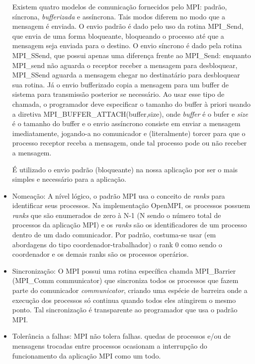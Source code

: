 \documentclass[a4paper,10pt]{article}
\begin{document}
\begin{itemize}
Existem quatro modelos de comunicação fornecidos pelo MPI: padrão, síncrona, \emph{bufferizada} e assíncrona. Tais modos diferem no modo que a mensagem é enviada. O envio padrão é dado pelo uso da rotina MPI\_Send, que envia de uma forma bloqueante, bloqueando o processo até que a mensagem seja enviada para o destino. O envio síncrono é dado pela rotina MPI\_SSend, que possui apenas uma diferença frente ao MPI\_Send: enquanto MPI\_send não aguarda o receptor receber a mensagem para desbloquear, MPI\_SSend aguarda a mensagem chegar no destinatário para desbloquear sua rotina. Já o envio bufferizado copia a mensagem para um buffer de sistema para transmissão posterior se necessário. Ao usar esse tipo de chamada, o programador deve especificar o tamanho do buffer à priori usando a diretiva MPI\_BUFFER\_ATTACH(buffer,size), onde \emph{buffer} é o bufer e \emph{size} é o tamanho do buffer e o envio assíncrono consiste em enviar a mensagem imediatamente, jogando-a no comunicador e (literalmente) torcer para que o processo receptor receba a mensagem, onde tal processo pode ou não receber a mensagem.

É utilizado o envio padrão (bloqueante) na nossa aplicação por ser o mais simples e necessário para a aplicação.\\


\item{Nomeação}: A nível lógico, o padrão MPI usa o conceito de \emph{ranks} para identificar seus processos. Na implementação OpenMPI, os processos possuem \emph{ranks} que são enumerados de zero à N-1 (N sendo o número total de processos da aplicação MPI)  e os \emph{ranks} são os identificadores de um processo dentro de um dado comunicador. Por padrão, costuma-se usar (em abordagens do tipo coordenador-trabalhador) o rank 0 como sendo o coordenador e os demais ranks são os processos operários.\\

\item{Sincronização}: O MPI possui uma rotina específica chamda MPI\_Barrier (MPI\_Comm communicator) que sincroniza todos os processos que fazem parte do comunicador \emph{communicator}, criando uma espécie de barreira onde a execução dos processos só continua quando todos eles atingirem o mesmo ponto. Tal sincronização é transparente ao programador que usa o padrão MPI.

\item{Tolerância a falhas}: MPI não tolera falhas. quedas de processos e/ou de mensagens trocadas entre processos ocasionam a interrupção do funcionamento da aplicação MPI como um todo.


\end{itemize}
\end{document}
